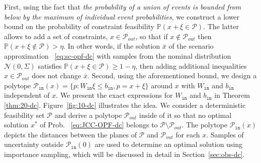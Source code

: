 First, using the fact that \emph{the probability of a union of events is bounded from below by the maximum of individual event probabilities}, we construct a lower bound on the probability of constraint feasibility $\mathbb{P}(x+\xi \in \mathcal{P})$. The latter allows to add a set of constraints, $x\in \mathcal{P}_{out}$, so that if $x\not\in \mathcal{P}_{out}$ then $\mathbb{P}(x+\xi \notin \mathcal{P}) > \eta$. In other words, if the solution $\bar x$ of the scenario approximation~ \eqref{eq:sc-opf-dc} with samples from the nominal distribution $\mathcal{N}(0,\Sigma)$ satisfies $\mathbb{P}(x+\xi \in \mathcal{P}) \ge 1-\eta$, then adding additional inequalities $x\in \mathcal{P}_{out}$ does not change $\bar x$. Second, using the aforementioned bound, we design a polytope $\mathcal{P}_{\texttt{in}}(x) = \{p: W_{\texttt{in}} \xi \le b_{\texttt{in}}, p = x+\xi\}$ around $x$ with $W_{\texttt{in}}$ and $b_{\texttt{in}}$ independent of $x$. We present the exact expressions for $W_{\texttt{in}}$ and $b_{\texttt{in}}$ in Theorem \ref{thm:20-dc}. Figure~\ref{fig:10-dc} illustrates the idea. We consider a deterministic feasibility set $\mathcal{P}$ and derive a polytope $\mathcal{P}_{out}$ inside of it so that no optimal solution $x^*$ of Prob.~ \eqref{eq:JCC-OPF-dc} belongs to $\mathcal{P}\setminus \mathcal{P}_{out}$. The polytope $\mathcal{P}_{\texttt{in}}(x)$ depicts the distances between the planes of $\mathcal{P}$ and $\mathcal{P}_{out}$ for each $x$.
Samples of uncertainty outside $\mathcal{P}_{\texttt{in}}(0)$ are used to determine an optimal solution using importance sampling, which will be discussed in detail in Section~\ref{sec:obs-dc}.

